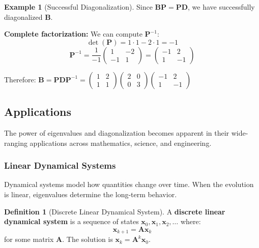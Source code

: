 \documentclass[12pt]{article}
\numberwithin{equation}{section}
\newcommand{\vect}[1]{\boldsymbol{#1}}   %
\newcommand{\mat}[1]{\mathbf{#1}}        %
\theoremstyle{plain}
\theoremstyle{definition}
\newtheorem{definition}[theorem]{Definition}
\newtheorem{example}[theorem]{Example}
\theoremstyle{remark}
\begin{document}
\begin{example}[Successful Diagonalization]
Since $\mat{B}\mat{P} = \mat{P}\mat{D}$, we have successfully diagonalized $\mat{B}$.

\textbf{Complete factorization:} We can compute $\mat{P}^{-1}$:
$$\det(\mat{P}) = 1 \cdot 1 - 2 \cdot 1 = -1$$
$$\mat{P}^{-1} = \frac{1}{-1}\begin{pmatrix} 1 & -2 \\ -1 & 1 \end{pmatrix} = \begin{pmatrix} -1 & 2 \\ 1 & -1 \end{pmatrix}$$

Therefore: $\mat{B} = \mat{P}\mat{D}\mat{P}^{-1} = \begin{pmatrix} 1 & 2 \\ 1 & 1 \end{pmatrix}\begin{pmatrix} 2 & 0 \\ 0 & 3 \end{pmatrix}\begin{pmatrix} -1 & 2 \\ 1 & -1 \end{pmatrix}$
\end{example}

\subsection{Applications}

The power of eigenvalues and diagonalization becomes apparent in their wide-ranging applications across mathematics, science, and engineering.

\subsubsection{Linear Dynamical Systems}

Dynamical systems model how quantities change over time. When the evolution is linear, eigenvalues determine the long-term behavior.

\begin{definition}[Discrete Linear Dynamical System]
A \textbf{discrete linear dynamical system} is a sequence of states $\vect{x}_0, \vect{x}_1, \vect{x}_2, \ldots$ where:
$$\vect{x}_{k+1} = \mat{A}\vect{x}_k$$
for some matrix $\mat{A}$. The solution is $\vect{x}_k = \mat{A}^k\vect{x}_0$.
\end{definition}
\end{document}
